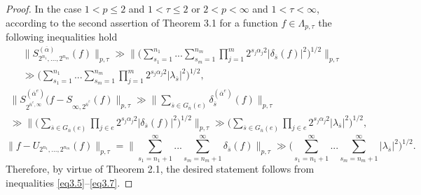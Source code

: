 \documentclass[12pt]{article}
\theoremstyle{plain}
\begin{document}
\begin{proof}
 In the case 
$1<p\leqslant 2$ and $1<\tau \leqslant 2$ or $2< p<\infty$ and $1<\tau <\infty$, according to the second assertion of Theorem 3.1 for a function $f \in \Lambda_{p ,\tau}$ the following inequalities hold 
 \begin{multline}\label{eq3.5}
\|S_{2^{n_{1}},...,2^{n_{m}}}^{(\overline{\alpha})}(f)\|_{p, \tau}
\gg \Biggl\|\Biggl(\sum\limits_{s_{1}=1}^{n_{1}}...\sum\limits_{s_{m}=1}^{n_{m}}\prod_{j=1}^{m}2^{s_{j}\alpha_{j}2}|\delta_{\overline{s}}(f)|^{2}\Biggr)^{1/2} \Biggr\|_{p, \tau} 
\\
\gg 
\Biggl(\sum\limits_{s_{1}=1}^{n_{1}}...\sum\limits_{s_{m}=1}^{n_{m}}\prod_{j=1}^{m}2^{s_{j}\alpha_{j}2}|\lambda_{\overline{s}}|^{2}\Biggr)^{1/2},
\end{multline} 
\begin{multline}\label{eq3.6} 
\|S_{2^{\overline{n}^{e}, \infty}}^{(\overline{\alpha}^{e})}(f-S_{\infty, 2^{\overline{n}^{\hat{e}}}}(f)\|_{p, \tau}
\gg \biggl\|\sum\limits_{\overline{s}\in G_{\overline{n}}(e)}\delta_{\overline{s}}^{(\overline{\alpha}^{e})}(f) \biggr\|_{p, \tau}
\\ 
 \gg  \biggl\|\biggl(\sum\limits_{\overline{s}\in G_{\overline{n}}(e)}\prod_{j\in e}2^{s_{j}\alpha_{j}2} |\delta_{\overline{s}}(f)|^{2}\biggr)^{1/2} \biggr\|_{p, \tau} \gg \biggl(\sum\limits_{\overline{s}\in G_{\overline{n}}(e)}\prod_{j\in e}2^{s_{j}\alpha_{j}2} |\lambda_{\overline{s}}|^{2}\biggr)^{1/2}, 
\end{multline}
\begin{equation}\label{eq3.7} 
\|f-U_{2^{n_{1}},...,2^{n_{m}}} (f)\|_{p, \tau} =\biggl\|\sum\limits_{s_{1}=n_{1}+1}^{\infty}...\sum\limits_{s_{m}=n_{m}+1}^{\infty} \delta_{\overline{s}}(f) \biggr\|_{p, \tau} \gg \biggl(\sum\limits_{s_{1}=n_{1}+1}^{\infty}...\sum\limits_{s_{m}=n_{m}+1}^{\infty}|\lambda_{\overline{s}}|^{2}  \biggr)^{1/2}.
\end{equation}
Therefore, by virtue of Theorem 2.1, the desired statement follows from inequalities \eqref{eq3.5}--\eqref{eq3.7}.
\end{proof}
 
\end{document}
